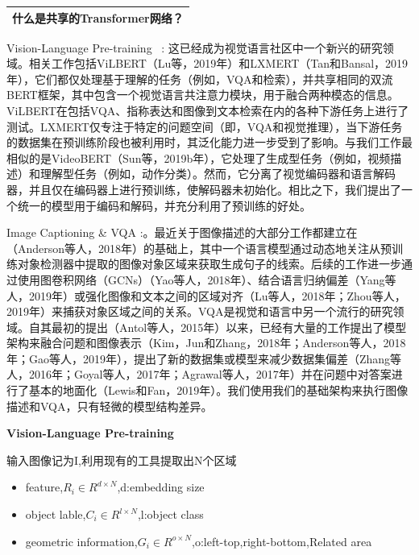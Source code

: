 \documentclass{article}
\begin{document}
\begin{sloppypar}
\begin{table}[!htbp]
            \centering
            \begin{tabularx}{\textwidth}{|X|}
                  \hline
                  什么是共享的Transformer网络？
                  \\
                  \hline
            \end{tabularx}%

      \end{table}%

      Vision-Language Pre-training  : 这已经成为视觉语言社区中一个新兴的研究领域。相关工作包括ViLBERT（Lu等，2019年）和LXMERT（Tan和Bansal，2019年），它们都仅处理基于理解的任务（例如，VQA和检索），并共享相同的双流BERT框架，其中包含一个视觉语言共注意力模块，用于融合两种模态的信息。ViLBERT在包括VQA、指称表达和图像到文本检索在内的各种下游任务上进行了测试。LXMERT仅专注于特定的问题空间（即，VQA和视觉推理），当下游任务的数据集在预训练阶段也被利用时，其泛化能力进一步受到了影响。与我们工作最相似的是VideoBERT（Sun等，2019b年），它处理了生成型任务（例如，视频描述）和理解型任务（例如，动作分类）。然而，它分离了视觉编码器和语言解码器，并且仅在编码器上进行预训练，使解码器未初始化。相比之下，我们提出了一个统一的模型用于编码和解码，并充分利用了预训练的好处。

      Image Captioning \& VQA :。最近关于图像描述的大部分工作都建立在（Anderson等人，2018年）的基础上，其中一个语言模型通过动态地关注从预训练对象检测器中提取的图像对象区域来获取生成句子的线索。后续的工作进一步通过使用图卷积网络（GCNs）（Yao等人，2018年）、结合语言归纳偏差（Yang等人，2019年）或强化图像和文本之间的区域对齐（Lu等人，2018年；Zhou等人，2019年）来捕获对象区域之间的关系。VQA是视觉和语言中另一个流行的研究领域。自其最初的提出（Antol等人，2015年）以来，已经有大量的工作提出了模型架构来融合问题和图像表示（Kim，Jun和Zhang，2018年；Anderson等人，2018年；Gao等人，2019年），提出了新的数据集或模型来减少数据集偏差（Zhang等人，2016年；Goyal等人，2017年；Agrawal等人，2017年）并在问题中对答案进行了基本的地面化（Lewis和Fan，2019年）。我们使用我们的基础架构来执行图像描述和VQA，只有轻微的模型结构差异。

      \centerline{\textbf{Vision-Language Pre-training}}

      输入图像记为I,利用现有的工具提取出N个区域

      \begin{itemize}
            \item feature,$R_i \in R^{d \times N}$,d:embedding size
            \item object lable,$C_i \in R^{l \times N}$,l:object class
            \item geometric information,$G_i \in R^{o \times N}$,o:left-top,right-bottom,Related area
      \end{itemize}
      \begin{table}[!htbp]
            \renewcommand\arraystretch{2}


\end{table}
\end{sloppypar}
\end{document}
